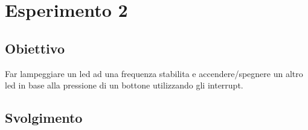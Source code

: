 \chapter*{Esperimento 2}

\section*{Obiettivo}
Far lampeggiare un led ad una frequenza stabilita e accendere/spegnere un altro led in base alla pressione di un bottone utilizzando gli interrupt.

\section*{Svolgimento}
